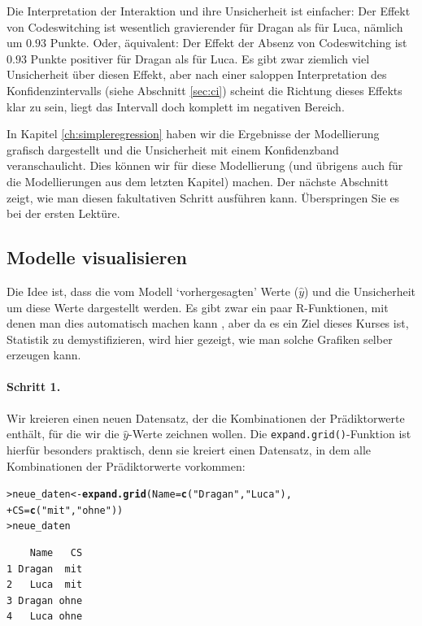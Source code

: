\documentclass[oneside, 10pt]{book}\usepackage[]{graphicx}\usepackage[]{xcolor}
\makeatletter
\newcommand{\hlstr}[1]{\textcolor[rgb]{0.192,0.494,0.8}{#1}}%
\newcommand{\hlstd}[1]{\textcolor[rgb]{0.345,0.345,0.345}{#1}}%
\newcommand{\hlkwb}[1]{\textcolor[rgb]{0.69,0.353,0.396}{#1}}%
\newcommand{\hlkwc}[1]{\textcolor[rgb]{0.333,0.667,0.333}{#1}}%
\newcommand{\hlkwd}[1]{\textcolor[rgb]{0.737,0.353,0.396}{\textbf{#1}}}%
\newenvironment{kframe}{%
 \def\at@end@of@kframe{}%
 \ifinner\ifhmode%
  \def\at@end@of@kframe{\end{minipage}}%
  \begin{minipage}{\columnwidth}%
 \fi\fi%
 \def\FrameCommand##1{\hskip\@totalleftmargin \hskip-\fboxsep
 \colorbox{shadecolor}{##1}\hskip-\fboxsep
     \hskip-\linewidth \hskip-\@totalleftmargin \hskip\columnwidth}%
 \MakeFramed {\advance\hsize-\width
   \@totalleftmargin\z@ \linewidth\hsize
   \@setminipage}}%
 {\par\unskip\endMakeFramed%
 \at@end@of@kframe}
\newenvironment{knitrout}{}{} %
\makeatother
\begin{document}
Die Interpretation der Interaktion und ihre Unsicherheit ist einfacher: Der Effekt von Codeswitching
ist wesentlich gravierender für Dragan als für Luca, nämlich um $0.93$ Punkte. Oder, äquivalent:
Der Effekt der Absenz von Codeswitching ist $0.93$ Punkte positiver für Dragan als für Luca.
Es gibt zwar ziemlich viel Unsicherheit über diesen Effekt, aber nach einer
saloppen Interpretation des Konfidenzintervalls (siehe Abschnitt \vref{sec:ci})
scheint die Richtung dieses Effekts klar zu sein, liegt das Intervall doch
komplett im negativen Bereich.

In Kapitel \ref{ch:simpleregression} haben wir die
Ergebnisse der Modellierung grafisch dargestellt
und die Unsicherheit mit einem Konfidenzband veranschaulicht.
Dies können wir für diese Modellierung (und übrigens
auch für die Modellierungen aus dem letzten Kapitel) machen.
Der nächste Abschnitt zeigt, wie man diesen fakultativen Schritt ausführen kann.
Überspringen Sie es bei der ersten Lektüre.

\subsection{Modelle visualisieren}
Die Idee ist, dass die vom Modell `vorhergesagten'
Werte ($\widehat{y}$) und die Unsicherheit um
diese Werte dargestellt werden. Es gibt zwar
ein paar R-Funktionen, mit denen man dies automatisch
machen kann \citep[siehe][]{Fox2003}, aber da es ein Ziel
dieses Kurses ist, Statistik zu demystifizieren, wird hier
gezeigt, wie man solche Grafiken selber erzeugen kann.

\paragraph{Schritt 1.}
Wir kreieren einen neuen Datensatz, der die
Kombinationen der Prädiktorwerte enthält, für die wir
die $\widehat{y}$-Werte zeichnen wollen.
Die \texttt{expand.grid()}-Funktion ist hierfür besonders
praktisch, denn sie kreiert einen Datensatz, in dem
alle Kombinationen der Prädiktorwerte vorkommen:
\begin{knitrout}
\color{fgcolor}\begin{kframe}
\begin{alltt}
\hlstd{> }\hlstd{neue_daten} \hlkwb{<-} \hlkwd{expand.grid}\hlstd{(}\hlkwc{Name} \hlstd{=} \hlkwd{c}\hlstd{(}\hlstr{"Dragan"}\hlstd{,} \hlstr{"Luca"}\hlstd{),}
\hlstd{+ }                          \hlkwc{CS} \hlstd{=} \hlkwd{c}\hlstd{(}\hlstr{"mit"}\hlstd{,} \hlstr{"ohne"}\hlstd{))}
\hlstd{> }\hlstd{neue_daten}
\end{alltt}
\begin{verbatim}
    Name   CS
1 Dragan  mit
2   Luca  mit
3 Dragan ohne
4   Luca ohne
\end{verbatim}
\end{kframe}
\end{knitrout}
\end{document}
